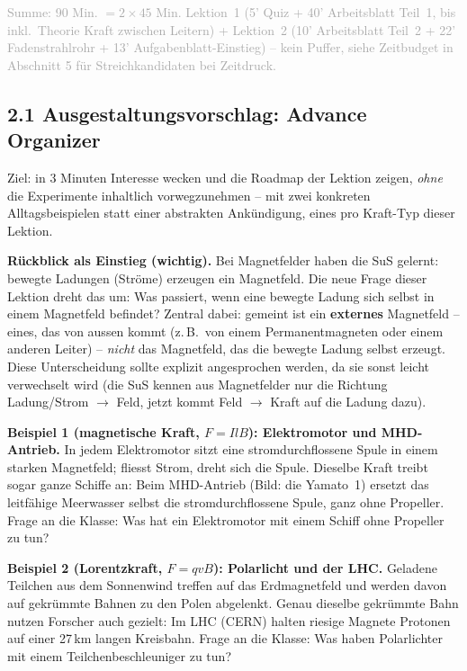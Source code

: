 \documentclass[11pt,a4paper]{article}
\begin{document}
\textcolor{darkgray}{\small Summe: 90 Min. $=2\times45$ Min. Lektion~1
(5' Quiz + 40' Arbeitsblatt Teil~1, bis inkl.\ Theorie Kraft zwischen
Leitern) + Lektion~2 (10' Arbeitsblatt Teil~2 + 22' Fadenstrahlrohr +
13' Aufgabenblatt-Einstieg) -- kein Puffer, siehe Zeitbudget in
Abschnitt 5 für Streichkandidaten bei Zeitdruck.}

\subsection*{2.1 Ausgestaltungsvorschlag: Advance Organizer}

Ziel: in 3 Minuten Interesse wecken und die Roadmap der Lektion zeigen,
\emph{ohne} die Experimente inhaltlich vorwegzunehmen -- mit zwei
konkreten Alltagsbeispielen statt einer abstrakten Ankündigung, eines pro
Kraft-Typ dieser Lektion.

\textbf{Rückblick als Einstieg (wichtig).} Bei Magnetfelder haben die SuS
gelernt: bewegte Ladungen (Ströme) erzeugen ein Magnetfeld. Die neue Frage
dieser Lektion dreht das um: Was passiert, wenn eine bewegte Ladung sich
selbst in einem Magnetfeld befindet? Zentral dabei: gemeint ist ein
\textbf{externes} Magnetfeld -- eines, das von aussen kommt (z.\,B.\ von
einem Permanentmagneten oder einem anderen Leiter) -- \emph{nicht} das
Magnetfeld, das die bewegte Ladung selbst erzeugt. Diese Unterscheidung
sollte explizit angesprochen werden, da sie sonst leicht verwechselt wird
(die SuS kennen aus Magnetfelder nur die Richtung \glqq Ladung/Strom
$\to$ Feld\grqq{}, jetzt kommt \glqq Feld $\to$ Kraft auf die Ladung\grqq{}
dazu).

\textbf{Beispiel 1 (magnetische Kraft, $F=IlB$): Elektromotor und
MHD-Antrieb.} In jedem Elektromotor sitzt eine stromdurchflossene Spule
in einem starken Magnetfeld; fliesst Strom, dreht sich die Spule.
Dieselbe Kraft treibt sogar ganze Schiffe an: Beim MHD-Antrieb (Bild: die
Yamato~1) ersetzt das leitfähige Meerwasser selbst die stromdurchflossene
Spule, ganz ohne Propeller. Frage an die Klasse: \glqq Was hat ein
Elektromotor mit einem Schiff ohne Propeller zu tun?\grqq{}

\textbf{Beispiel 2 (Lorentzkraft, $F=qvB$): Polarlicht und der LHC.}
Geladene Teilchen aus dem Sonnenwind treffen auf das Erdmagnetfeld und
werden davon auf gekrümmte Bahnen zu den Polen abgelenkt. Genau dieselbe
gekrümmte Bahn nutzen Forscher auch gezielt: Im LHC (CERN) halten riesige
Magnete Protonen auf einer 27\,km langen Kreisbahn. Frage an die Klasse:
\glqq Was haben Polarlichter mit einem Teilchenbeschleuniger zu
tun?\grqq{}
\end{document}

